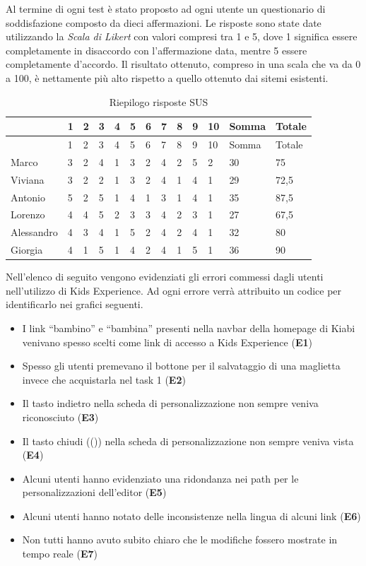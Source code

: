 \documentclass[12pt,italian,]{report}
\providecommand{\tightlist}{%
  \setlength{\itemsep}{0pt}\setlength{\parskip}{0pt}}
\begin{document}
Al termine di ogni test è stato proposto ad ogni utente un questionario
di soddisfazione composto da dieci affermazioni. Le risposte sono state
date utilizzando la \emph{Scala di Likert} con valori compresi tra 1 e
5, dove 1 significa essere completamente in disaccordo con
l'affermazione data, mentre 5 essere completamente d'accordo. Il
risultato ottenuto, compreso in una scala che va da 0 a 100, è
nettamente più alto rispetto a quello ottenuto dai sitemi esistenti.

\begin{longtable}[]{@{}lllllllllllll@{}}
\caption{Riepilogo risposte SUS}\tabularnewline
\toprule
& 1 & 2 & 3 & 4 & 5 & 6 & 7 & 8 & 9 & 10 & Somma & Totale\tabularnewline
\midrule
\endfirsthead
\toprule
& 1 & 2 & 3 & 4 & 5 & 6 & 7 & 8 & 9 & 10 & Somma & Totale\tabularnewline
\midrule
\endhead
Marco & 3 & 2 & 4 & 1 & 3 & 2 & 4 & 2 & 5 & 2 & 30 & 75\tabularnewline
Viviana & 3 & 2 & 2 & 1 & 3 & 2 & 4 & 1 & 4 & 1 & 29 &
72,5\tabularnewline
Antonio & 5 & 2 & 5 & 1 & 4 & 1 & 3 & 1 & 4 & 1 & 35 &
87,5\tabularnewline
Lorenzo & 4 & 4 & 5 & 2 & 3 & 3 & 4 & 2 & 3 & 1 & 27 &
67,5\tabularnewline
Alessandro & 4 & 3 & 4 & 1 & 5 & 2 & 4 & 2 & 4 & 1 & 32 &
80\tabularnewline
Giorgia & 4 & 1 & 5 & 1 & 4 & 2 & 4 & 1 & 5 & 1 & 36 & 90\tabularnewline
\bottomrule
\end{longtable}

Nell'elenco di seguito vengono evidenziati gli errori commessi dagli
utenti nell'utilizzo di Kids Experience. Ad ogni errore verrà attribuito
un codice per identificarlo nei grafici seguenti.

\begin{itemize}
\tightlist
\item
  I link ``bambino'' e ``bambina'' presenti nella navbar della homepage
  di Kiabi venivano spesso scelti come link di accesso a Kids Experience
  (\textbf{E1})
\item
  Spesso gli utenti premevano il bottone per il salvataggio di una
  maglietta invece che acquistarla nel task 1 (\textbf{E2})
\item
  Il tasto indietro nella scheda di personalizzazione non sempre veniva
  riconosciuto (\textbf{E3})
\item
  Il tasto chiudi ((\times)) nella scheda di personalizzazione non
  sempre veniva vista (\textbf{E4})
\item
  Alcuni utenti hanno evidenziato una ridondanza nei path per le
  personalizzazioni dell'editor (\textbf{E5})
\item
  Alcuni utenti hanno notato delle inconsistenze nella lingua di alcuni
  link (\textbf{E6})
\item
  Non tutti hanno avuto subito chiaro che le modifiche fossero mostrate
  in tempo reale (\textbf{E7})
\end{itemize}
\end{document}
